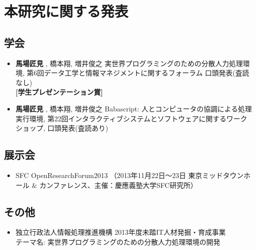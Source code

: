 \chapter*{本研究に関する発表}
\label{chap:publications}

\section*{学会}

\begin{itemize}
\itemsep1pt\parskip0pt
\item
  \textbf{馬場匠見} , 橋本翔, 増井俊之
  実世界プログラミングのための分散人力処理環境,
  第6回データ工学と情報マネジメントに関するフォーラム
  口頭発表(査読なし)\\ \textbf{{[}学生プレゼンテーション賞{]}}
\item
  \textbf{馬場匠見} , 橋本翔, 増井俊之 Babascript:
  人とコンピュータの協調による処理実行環境,
  第22回インタラクティブシステムとソフトウェアに関するワークショップ,
  口頭発表(査読あり)
\end{itemize}

\section*{展示会}

\begin{itemize}
\itemsep1pt\parskip0pt
\item
  SFC OpenResearchForum2013 （2013年11月22日〜23日
  東京ミッドタウンホール \&
  カンファレンス、主催：慶應義塾大学SFC研究所）
\end{itemize}

\section*{その他}

\begin{itemize}
\itemsep1pt\parskip0pt
\item
  独立行政法人情報処理推進機構 2013年度未踏IT人材発掘・育成事業\\
  テーマ名: 実世界プログラミングのための分散人力処理環境の開発
\end{itemize}
